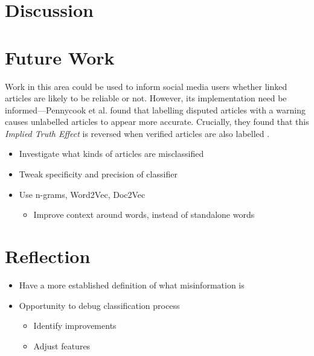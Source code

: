 \documentclass[12pt]{article}
\begin{document}
	\section{Discussion}
	\section{Future Work}

	Work in this area could be used to inform social media users whether linked articles are likely to be reliable or not. However, its implementation need be informed---Pennycook et al. found that labelling disputed articles with a warning causes unlabelled articles to appear more accurate. Crucially, they found that this \textit{Implied Truth Effect} is reversed when verified articles are also labelled \cite{pennycook}.

	\begin{itemize}
		\item Investigate what kinds of articles are misclassified
		\item Tweak specificity and precision of classifier
		\item Use n-grams, Word2Vec, Doc2Vec
		\begin{itemize}
			\item Improve context around words, instead of standalone words
		\end{itemize}
	\end{itemize}

	\section{Reflection}

	\begin{itemize}
		\item Have a more established definition of what misinformation is
		\item Opportunity to debug classification process
		\begin{itemize}
			\item Identify improvements
			\item Adjust features
		\end{itemize}
	\end{itemize}

	
	
\end{document}
